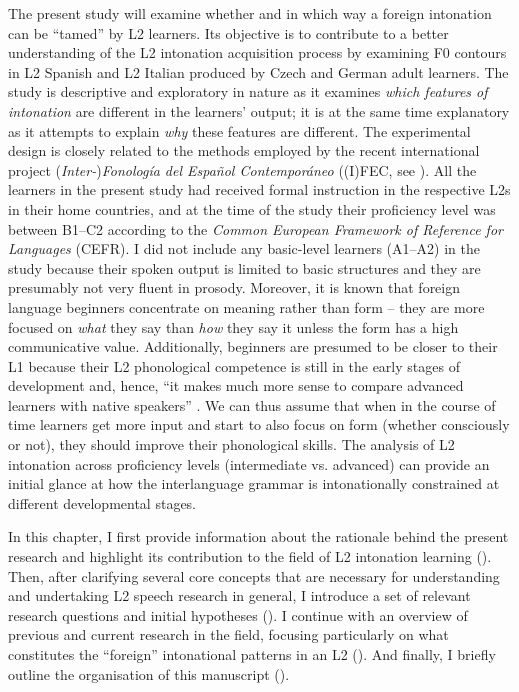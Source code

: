 The present study will examine whether and in which way a foreign intonation can be “tamed” by L2 learners. Its objective is to contribute to a better understanding of the L2 intonation acquisition process by examining F0 contours in L2 Spanish and L2 Italian produced by Czech and German adult learners. The study is descriptive and exploratory in nature as it examines \textit{which features of intonation} are different in the learners’ output; it is at the same time explanatory as it attempts to explain \textit{why} these features are different. The experimental design is closely related to the methods employed by the recent international project (\textit{Inter-})\textit{Fonología del Español Contemporáneo} ((I)FEC, see \citealt{PustkaEtAl2016,PustkaEtAl2018}). All the learners in the present study had received formal instruction in the respective L2s in their home countries, and at the time of the study their proficiency level was between B1–C2 according to the \textit{Common European Framework of Reference for Languages} (CEFR). I did not include any basic-level learners (A1–A2) in the study because their spoken output is limited to basic structures and they are presumably not very fluent in prosody. Moreover, it is known that foreign language beginners concentrate on meaning rather than form \citep{VanPatten1996} -- they are more focused on \textit{what} they say than \textit{how} they say it unless the form has a high communicative value. Additionally, beginners are presumed to be closer to their L1 because their L2 phonological competence is still in the early stages of development and, hence, “it makes much more sense to compare advanced learners with native speakers” \citep[11]{Granger2015}. We can thus assume that when in the course of time learners get more input and start to also focus on form (whether consciously or not), they should improve their phonological skills. The analysis of L2 intonation across proficiency levels (intermediate vs. advanced) can provide an initial glance at how the interlanguage grammar is intonationally constrained at different developmental stages.



In this chapter, I first provide information about the rationale behind the pres\-ent research and highlight its contribution to the field of L2 intonation learning (). Then, after clarifying several core concepts that are necessary for understanding and undertaking L2 speech research in general, I introduce a set of relevant research questions and initial hypotheses (). I continue with an overview of previous and current research in the field, focusing particularly on what constitutes the “foreign” intonational patterns in an L2 (). And finally, I briefly outline the organisation of this manuscript ().


